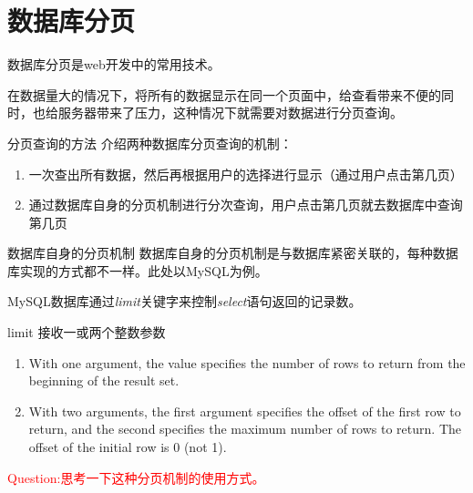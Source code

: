 \documentclass{beamer}
\begin{document}
\section{数据库分页} %
\begin{frame}
数据库分页是web开发中的常用技术。

在数据量大的情况下，将所有的数据显示在同一个页面中，给查看带来不便的同时，也给服务器带来了压力，这种情况下就需要对数据进行分页查询。
\end{frame}
\begin{frame}{分页查询的方法}
介绍两种数据库分页查询的机制：
\begin{enumerate}
\item
一次查出所有数据，然后再根据用户的选择进行显示（通过用户点击第几页）


\item
通过数据库自身的分页机制进行分次查询，用户点击第几页就去数据库中查询第几页

\end{enumerate}
\end{frame}
\begin{frame}{数据库自身的分页机制}
数据库自身的分页机制是与数据库紧密关联的，每种数据库实现的方式都不一样。此处以MySQL为例。

MySQL数据库通过\emph{limit}关键字来控制\emph{select}语句返回的记录数。
\begin{block}{limit 接收一或两个整数参数}
\begin{enumerate}
\item
With one argument, the value specifies the number of rows to return from the beginning of the result set.

\item
With two arguments, the first argument specifies the offset of the first row to return, and the second specifies the maximum number of rows to return. The offset of the initial row is 0 (not 1).

\end{enumerate}
\end{block}
\textcolor{red}{Question:思考一下这种分页机制的使用方式。}
\end{frame}
\end{document}
